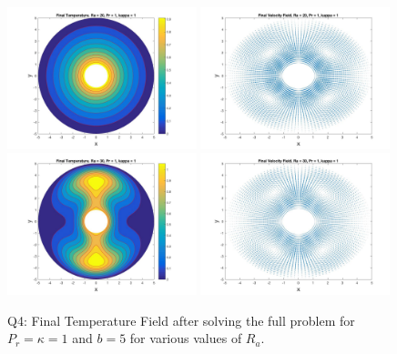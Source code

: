 \documentclass{article}
\begin{document}
	\begin{figure}[h!]
		\centering
		\includegraphics[width = 0.49\textwidth]{fig_q4ra20b5}
		\includegraphics[width = 0.49\textwidth]{fig_q4ura20b5}
		\includegraphics[width = 0.49\textwidth]{fig_q4ra30b5}
		\includegraphics[width = 0.49\textwidth]{fig_q4ura30b5}
		\caption{Q4: Final Temperature Field after solving the full problem for $P_r = \kappa = 1$ and $b=5$ for various values of $R_a$.}
		\label{fig:q4Rab5}
	\end{figure}
\end{document}
